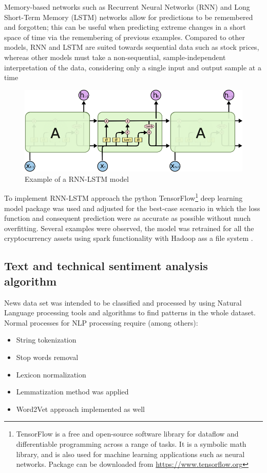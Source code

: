Memory-based networks such as Recurrent Neural Networks (RNN) and Long Short-Term Memory (LSTM) networks allow for predictions to be remembered and forgotten; this can be useful when predicting extreme changes in a short space of time via the remembering of previous examples. Compared to other models, RNN and LSTM are suited towards sequential data such as stock prices, whereas other models must take a non-sequential, sample-independent interpretation of the data, considering only a single input and output sample at a time \cite{chen_lstm-based_2015}

\begin{figure}[H]
   \centering
   \includegraphics[width=\linewidth]{fig/RNNLSTM2.png}
    \caption{Example of a RNN-LSTM model}
    \label{fig:RNNLSTM2}
\end{figure}

To implement RNN-LSTM approach the python TensorFlow\footnote{TensorFlow is a free and open-source software library for dataflow and differentiable programming across a range of tasks. It is a symbolic math library, and is also used for machine learning applications such as neural networks. Package can be downloaded from \hyperref[https://www.tensorflow.org]{https://www.tensorflow.org}}  deep learning model package was used and adjusted for the best-case scenario in which the loss function and consequent prediction were as accurate as possible without much overfitting. Several examples were observed, the model was retrained for all the cryptocurrency assets using spark functionality with Hadoop ass a file system \cite{yacoub_ahmed_predicting_2019}. 

\subsection{Text and technical sentiment analysis algorithm}

News data set was intended to be classified and processed by using Natural Language processing tools and algorithms to find patterns in the whole dataset. Normal processes for NLP processing require (among others):
\begin{itemize}
    \item String tokenization
    \item Stop words removal
    \item Lexicon normalization
    \item Lemmatization method was applied
    \item Word2Vet approach implemented as well
\end{itemize}

